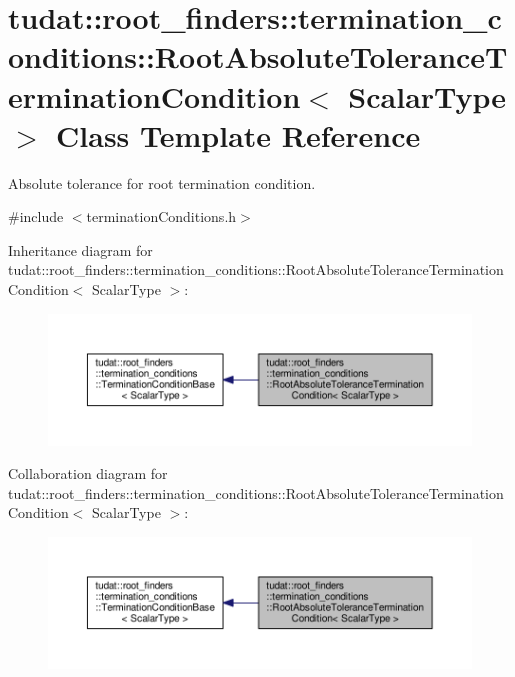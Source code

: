 \hypertarget{classtudat_1_1root__finders_1_1termination__conditions_1_1RootAbsoluteToleranceTerminationCondition}{}\section{tudat\+:\+:root\+\_\+finders\+:\+:termination\+\_\+conditions\+:\+:Root\+Absolute\+Tolerance\+Termination\+Condition$<$ Scalar\+Type $>$ Class Template Reference}
\label{classtudat_1_1root__finders_1_1termination__conditions_1_1RootAbsoluteToleranceTerminationCondition}


Absolute tolerance for root termination condition.  




{\ttfamily \#include $<$termination\+Conditions.\+h$>$}



Inheritance diagram for tudat\+:\+:root\+\_\+finders\+:\+:termination\+\_\+conditions\+:\+:Root\+Absolute\+Tolerance\+Termination\+Condition$<$ Scalar\+Type $>$\+:
\nopagebreak
\begin{figure}[H]
\begin{center}
\leavevmode
\includegraphics[width=350pt]{classtudat_1_1root__finders_1_1termination__conditions_1_1RootAbsoluteToleranceTerminationCondition__inherit__graph}
\end{center}
\end{figure}


Collaboration diagram for tudat\+:\+:root\+\_\+finders\+:\+:termination\+\_\+conditions\+:\+:Root\+Absolute\+Tolerance\+Termination\+Condition$<$ Scalar\+Type $>$\+:
\nopagebreak
\begin{figure}[H]
\begin{center}
\leavevmode
\includegraphics[width=350pt]{classtudat_1_1root__finders_1_1termination__conditions_1_1RootAbsoluteToleranceTerminationCondition__coll__graph}
\end{center}
\end{figure}
